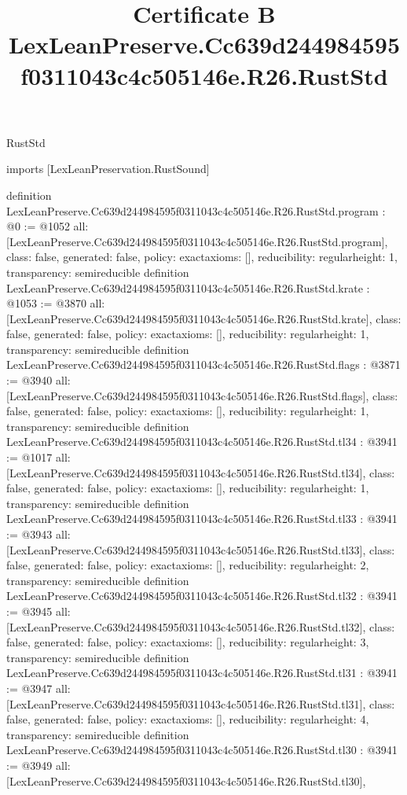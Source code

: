\begin{lexlean}{RustStd}
\title{Certificate B LexLeanPreserve.Cc639d244984595f0311043c4c505146e.R26.RustStd}
\begin{coremodule}
imports [LexLeanPreservation.RustSound]

definition LexLeanPreserve.Cc639d244984595f0311043c4c505146e.R26.RustStd.program : @0 := @1052 {
  all: [LexLeanPreserve.Cc639d244984595f0311043c4c505146e.R26.RustStd.program],
  class: false,
  generated: false,
  policy: exact{axioms: []},
  reducibility: regular{height: 1},
  transparency: semireducible
}
definition LexLeanPreserve.Cc639d244984595f0311043c4c505146e.R26.RustStd.krate : @1053 := @3870 {
  all: [LexLeanPreserve.Cc639d244984595f0311043c4c505146e.R26.RustStd.krate],
  class: false,
  generated: false,
  policy: exact{axioms: []},
  reducibility: regular{height: 1},
  transparency: semireducible
}
definition LexLeanPreserve.Cc639d244984595f0311043c4c505146e.R26.RustStd.flags : @3871 := @3940 {
  all: [LexLeanPreserve.Cc639d244984595f0311043c4c505146e.R26.RustStd.flags],
  class: false,
  generated: false,
  policy: exact{axioms: []},
  reducibility: regular{height: 1},
  transparency: semireducible
}
definition LexLeanPreserve.Cc639d244984595f0311043c4c505146e.R26.RustStd.tl34 : @3941 := @1017 {
  all: [LexLeanPreserve.Cc639d244984595f0311043c4c505146e.R26.RustStd.tl34],
  class: false,
  generated: false,
  policy: exact{axioms: []},
  reducibility: regular{height: 1},
  transparency: semireducible
}
definition LexLeanPreserve.Cc639d244984595f0311043c4c505146e.R26.RustStd.tl33 : @3941 := @3943 {
  all: [LexLeanPreserve.Cc639d244984595f0311043c4c505146e.R26.RustStd.tl33],
  class: false,
  generated: false,
  policy: exact{axioms: []},
  reducibility: regular{height: 2},
  transparency: semireducible
}
definition LexLeanPreserve.Cc639d244984595f0311043c4c505146e.R26.RustStd.tl32 : @3941 := @3945 {
  all: [LexLeanPreserve.Cc639d244984595f0311043c4c505146e.R26.RustStd.tl32],
  class: false,
  generated: false,
  policy: exact{axioms: []},
  reducibility: regular{height: 3},
  transparency: semireducible
}
definition LexLeanPreserve.Cc639d244984595f0311043c4c505146e.R26.RustStd.tl31 : @3941 := @3947 {
  all: [LexLeanPreserve.Cc639d244984595f0311043c4c505146e.R26.RustStd.tl31],
  class: false,
  generated: false,
  policy: exact{axioms: []},
  reducibility: regular{height: 4},
  transparency: semireducible
}
definition LexLeanPreserve.Cc639d244984595f0311043c4c505146e.R26.RustStd.tl30 : @3941 := @3949 {
  all: [LexLeanPreserve.Cc639d244984595f0311043c4c505146e.R26.RustStd.tl30],
}
\end{coremodule}
\end{lexlean}
